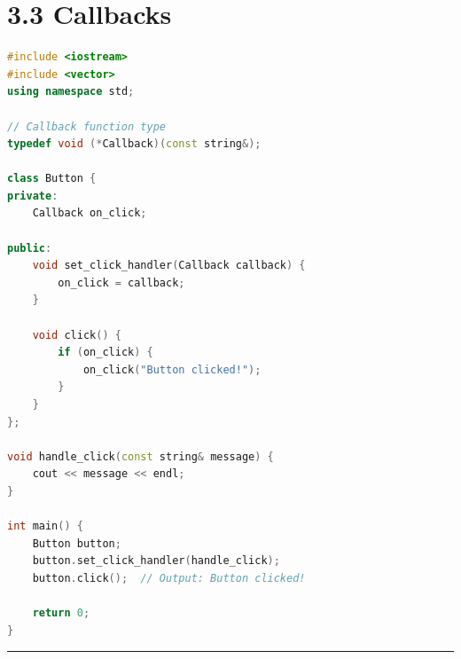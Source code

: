 \hypertarget{callbacks}{%
\section{3.3 Callbacks}\label{callbacks}}

\begin{lstlisting}[language={C++}]
#include <iostream>
#include <vector>
using namespace std;

// Callback function type
typedef void (*Callback)(const string&);

class Button {
private:
    Callback on_click;
    
public:
    void set_click_handler(Callback callback) {
        on_click = callback;
    }
    
    void click() {
        if (on_click) {
            on_click("Button clicked!");
        }
    }
};

void handle_click(const string& message) {
    cout << message << endl;
}

int main() {
    Button button;
    button.set_click_handler(handle_click);
    button.click();  // Output: Button clicked!
    
    return 0;
}
\end{lstlisting}

\begin{center}\rule{0.5\linewidth}{0.5pt}\end{center}
